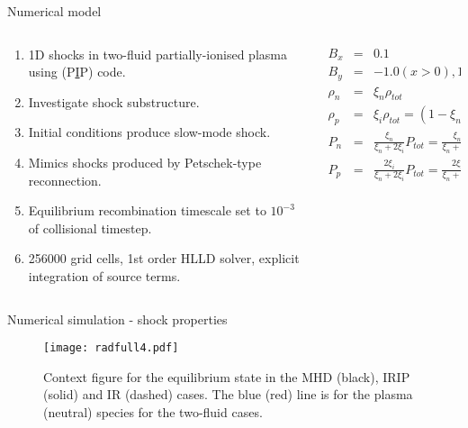 \documentclass[10pt,aspectratio=169,usenames,dvipsnames]{beamer}
\begin{document}
\begin{frame}{Numerical model}
\begin{columns}
\begin{column}{0.4\textwidth}
\begin{enumerate}
\item 1D shocks in two-fluid partially-ionised plasma using (P\underline{I}P) code.
\item Investigate shock substructure.
\item Initial conditions produce slow-mode shock.
\item Mimics shocks produced by Petschek-type reconnection.
\item Equilibrium recombination timescale set to $10^{-3}$ of collisional timestep.
\item 256000 grid cells, 1st order HLLD solver, explicit integration of source terms.
\end{enumerate}
\end{column}
\begin{column}{0.6\textwidth}
\begin{eqnarray}
B_x &=& 0.1 \\
B_y &=& -1.0 (x>0), 1.0 (x<0) \\
\rho _n &=& \xi _n \rho _{tot} \\
\rho _p &=& \xi _i \rho _{tot} = (1- \xi _n) \rho _{tot} \\
P_n &=& \frac{\xi _n}{\xi_n + 2 \xi _i} P_{tot} =  \frac{\xi _n}{\xi_n + 2 \xi _i} \beta \frac{B_0 ^2}{2} \\
P_p &=& \frac{2 \xi _i}{\xi_n + 2 \xi _i} P_{tot} =  \frac{2 \xi _i}{\xi_n + 2 \xi _i} \beta \frac{B_0 ^2}{2}
\end{eqnarray}
\end{column}
\end{columns}
\end{frame}

\begin{frame}{Numerical simulation - shock properties}
\begin{figure}
    \centering
\texttt{[image: radfull4.pdf]}
    \caption{Context figure for the equilibrium state in the MHD (black), IRIP (solid) and IR (dashed) cases. The blue (red) line is for the plasma (neutral) species for the two-fluid cases.}
    \label{fig:radfull}
\end{figure}
\end{frame}
\end{document}

